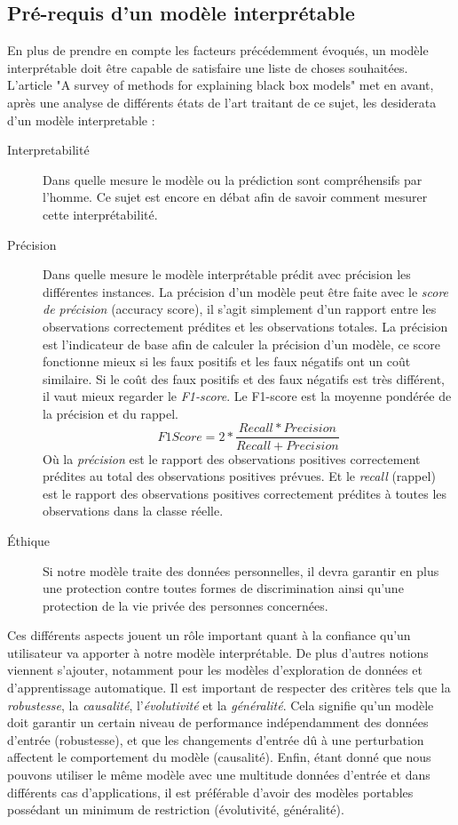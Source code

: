 \subsection{Pré-requis d'un modèle interprétable}
En plus de prendre en compte les facteurs précédemment évoqués, un modèle interprétable doit être capable de satisfaire une liste de choses souhaitées. L'article "A survey of methods for explaining black box models"\cite{surveyExplaining} met en avant, après une analyse de différents états de l'art traitant de ce sujet, les desiderata d'un modèle interpretable :
\begin{description}
\item[Interpretabilité] Dans quelle mesure le modèle ou la prédiction sont compréhensifs par l'homme. Ce sujet est encore en débat afin de savoir comment mesurer cette interprétabilité.

\item[Précision] Dans quelle mesure le modèle interprétable prédit avec précision les différentes instances. La précision d'un modèle peut être faite avec le \textit{score de précision} (accuracy score), il s'agit simplement d'un rapport entre les observations correctement prédites et les observations totales. La précision est l'indicateur de base afin de calculer la précision d'un modèle, ce score fonctionne mieux si les faux positifs et les faux négatifs ont un coût similaire. Si le coût des faux positifs et des faux négatifs est très différent, il vaut mieux regarder le \textit{F1-score}. Le F1-score est la moyenne pondérée de la précision et du rappel.
\[
F1 Score = 2*\frac{Recall * Precision}{Recall + Precision}
\]
Où la \textit{précision} est le rapport des observations positives correctement prédites au total des observations positives prévues. Et le \textit{recall} (rappel) est le rapport des observations positives correctement prédites à toutes les observations dans la classe réelle.

\item[Éthique] Si notre modèle traite des données personnelles, il devra garantir en plus une protection contre toutes formes de discrimination ainsi qu'une protection de la vie privée des personnes concernées.\\
\end{description}

Ces différents aspects jouent un rôle important quant à la confiance qu'un utilisateur va apporter à notre modèle interprétable. De plus d'autres notions viennent s'ajouter, notamment pour les modèles d'exploration de données et d'apprentissage automatique. Il est important de respecter des critères tels que la \textit{robustesse}, la \textit{causalité}, l'\textit{évolutivité} et la \textit{généralité}. Cela signifie qu'un modèle doit garantir un certain niveau de performance indépendamment des données d'entrée (robustesse), et que les changements d'entrée dû à une perturbation affectent le comportement du modèle (causalité). Enfin, étant donné que nous pouvons utiliser le même modèle avec une multitude données d'entrée et dans différents cas d'applications, il est préférable d'avoir des modèles portables possédant un minimum de restriction (évolutivité, généralité).

